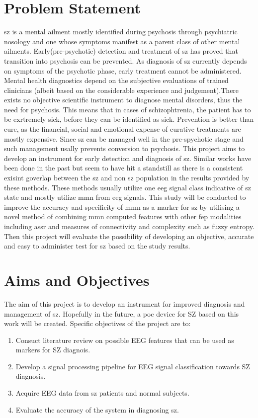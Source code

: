 \section{Problem Statement}\label{sec:Problem Statement}
\ac{sz} is a mental ailment mostly identified during psychosis through psychiatric nosology and one whose symptoms manifest as a parent class of other mental ailments. Early(pre-psychotic) detection and treatment of \ac{sz} has proved that transition into psychosis can be prevented. As diagnosis of \ac{sz} currently depends on symptoms of the psychotic phase, early treatment cannot be administered. Mental health diagnostics depend on the subjective evaluations of trained clinicians (albeit based on the considerable experience and judgement).There exists no objective scientific instrument to diagnose mental disorders, thus the need for psychosis. This means that in cases of schizophtrenia, the patient has to be exrtremely sick, before they can be identified as sick. Prevention is better than cure, as the financial, social and emotional expense of curative treatments are mostly expensive. Since \ac{sz} can be managed well in the pre-spychotic stage and such management usally prevents conversion to psychosis. This project aims to develop an instrument for early detection and diagnosis of \ac{sz}. 
Similar works have been done in the past but seem to have hit a standstill as there is a consistent exisint goverlap between the \ac{sz} and non \ac{sz} population in the results provided by these methods. These methods usually utilize one \ac{eeg} signal class indicative of \ac{sz} state and mostly utilize \ac{mmn} from \ac{eeg} signals. This study will be conducted to improve the accuracy and specificity of \ac{mmn} as a marker for \ac{sz} by utilising a novel method of combining \ac{mmn} computed features with other \ac{fep} modalities including \ac{assr} and measures of connectivity and complexity such as fuzzy entropy. Then this project will evaluate the possibility of developing an objective, accurate and easy to administer test for \ac{sz} based on the study results.

\section{Aims and Objectives}\label{sec:aims_objective}
The aim of this project is to develop an instrument for improved diagnosis and management of \ac{sz}. Hopefully in the future, a \ac{poc} device for SZ based on this work will be created.
Specific objectives of the project are to:
\begin{enumerate}
	\item Consuct literature review on possible EEG features that can be used as markers for SZ diagnois.
	\item Develop a signal processing pipeline for EEG signal classification towards SZ diagnosis.
	\item Acquire EEG data from \ac{sz} patients and normal subjects.
	\item Evaluate the accuracy of the system in diagnosing \ac{sz}.
\end{enumerate}

